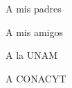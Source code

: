 \begin{agradecimiento}

  A mis padres
  
  
  A mis amigos
  
  
  A la UNAM
  
  
  A CONACYT
  

\end{agradecimiento}